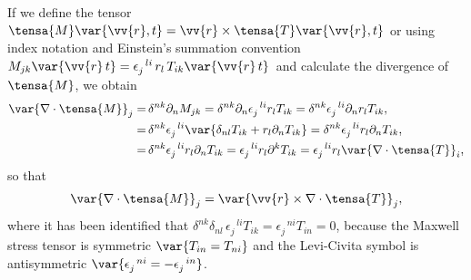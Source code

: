 If we define the tensor $\tensa{M}\var{\vv{r},t}=\vv{r}\times\tensa{T}\var{\vv{r},t}$ \textemdash or using index notation and Einstein's summation convention $M_{jk}\var{\vv{r}\,t}=\epsilon_{j}^{\,\,\,\, li} \, r_l \, T_{ik}\var{\vv{r}\,t}$\textemdash \, and calculate the divergence of $\tensa{M}$, we obtain
\begin{align}
\var{\nabla\cdot\tensa{M}}_{j} =& \,\delta^{nk} \partial_n M_{jk} = \delta^{nk} \partial_n \epsilon_{j}^{\,\,\,\, li} r_l T_{ik} =\delta^{nk}\epsilon_{j}^{\,\,\,\, li}\partial_n r_l T_{ik}, \nonumber \\
								=& \,\delta^{nk}\epsilon_{j}^{\,\,\,\, li}\var{\delta_{nl} T_{ik} + r_l \partial_n T_{ik}} =\delta^{nk}\epsilon_{j}^{\,\,\,\, li}r_l\partial_n T_{ik}, \nonumber \\
								=& \,\delta^{nk} \epsilon_{j}^{\,\,\,\, li} r_l \partial_n T_{ik} = \epsilon_{j}^{\,\,\,\, li} r_l \partial^k T_{ik} = \epsilon_{j}^{\,\,\,\, li} r_l \var{\nabla\cdot\tensa{T}}_i, 
\end{align}
so that
\begin{equation}
\var{\nabla\cdot\tensa{M}}_{j} = \var{\vv{r}\times \nabla\cdot\tensa{T}}_j,
\label{Eq: Div M}
\end{equation}
where it has been identified that $\delta^{nk}\delta_{nl}\,\epsilon_{j}^{\,\,\,\, li}T_{ik} = \epsilon_{j}^{\,\,\,\, ni}T_{in} = 0$, because the Maxwell stress tensor is symmetric $\var{T_{in}=T_{ni}}$ and the Levi-Civita symbol is antisymmetric $\var{\epsilon_{j}^{\,\,\,\, ni}=-\epsilon_{j}^{\,\,\,\, in}}$.

